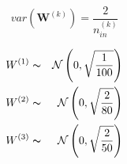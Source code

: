 \documentclass[xcolor={table}]{beamer}
\begin{document}
 \begin{frame} 
\begin{equation}
var(\mathbf{W}^{(k)})=\frac{2}{n_{in}^{(k)}}
\label{eq:kaiming}
\end{equation}
\end{frame} 



 \begin{frame} 
\begin{alignat}{3}
W^{(1)}  & \thicksim & \mathcal{N}\left(0, \sqrt{\frac{1}{100}}\right) \notag\\
W^{(2)}  & \thicksim & \mathcal{N}\left(0, \sqrt{\frac{2}{80}}\right) \notag\\
W^{(3)}  & \thicksim & \mathcal{N}\left(0, \sqrt{\frac{2}{50}}\right) 
\label{eq:3layerweightinit}
\end{alignat}
\end{frame} 
\end{document}
